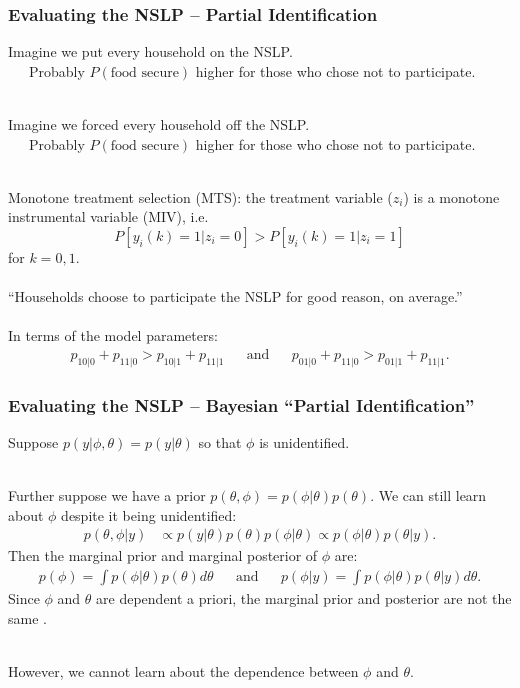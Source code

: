 \documentclass[xcolor=dvipsnames]{beamer}
\begin{document}
\begin{frame}
\frametitle{Evaluating the NSLP -- Partial Identification}
Imagine we put every household on the NSLP. \\
\ \ \ Probably $P(\mbox{food secure})$ higher for those who chose not to participate.\\~

\pause Imagine we forced every household off the NSLP. \\
\ \ \ Probably $P(\mbox{food secure})$ higher for those who chose not to participate.\\~


\pause Monotone treatment selection (MTS): the treatment variable ($z_i$) is a monotone instrumental variable (MIV), i.e.
\[
P[y_i(k)=1|z_i=0] > P[y_i(k)=1|z_i=1]
\]
for $k=0,1$.\\~\\

``Households choose to participate the NSLP for good reason, on average.''\\~\\

\pause In terms of the model parameters:
\begin{align*}
  p_{10|0} + p_{11|0} > p_{10|1} + p_{11|1} &&\mbox{and}&&  p_{01|0} + p_{11|0} > p_{01|1} + p_{11|1}.
\end{align*}
\end{frame}


\begin{frame}
\frametitle{Evaluating the NSLP -- Bayesian ``Partial Identification''}
Suppose $p(y|\phi,\theta)=p(y|\theta)$ so that $\phi$ is unidentified.\\~

Further suppose we have a prior $p(\theta,\phi)=p(\phi|\theta)p(\theta)$. \pause We can still learn about $\phi$ despite it being unidentified:
    \begin{align*}
    p(\theta,\phi|y) &\propto p(y|\theta)p(\theta)p(\phi|\theta) \propto p(\phi|\theta)p(\theta|y).
  \end{align*}
\pause Then the marginal prior and marginal posterior of $\phi$ are:
    \begin{align*}
    p(\phi) = \int p(\phi|\theta)p(\theta)d\theta  &&\mbox{and}&& p(\phi|y) = \int p(\phi|\theta)p(\theta|y)d\theta.
  \end{align*}
Since $\phi$ and $\theta$ are dependent a priori, the marginal prior and posterior are not the same \citep{poirier1998revising}.\\~

\pause However, we cannot learn about the dependence between $\phi$ and $\theta$.

\end{frame}
\end{document}
